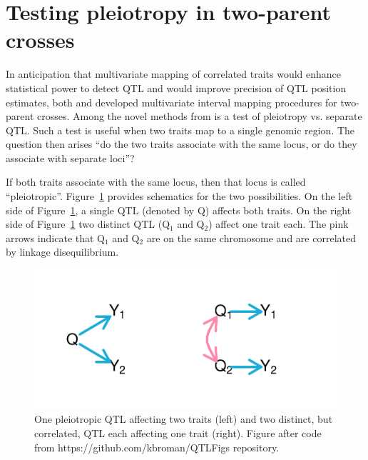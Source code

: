 \documentclass[oneside]{book}\usepackage[]{graphicx}\usepackage[]{color}
\newenvironment{knitrout}{}{} %
\begin{document}
\section{Testing pleiotropy in two-parent crosses}\label{sec:pleiotropy-two-parent}

In anticipation that multivariate mapping of correlated traits would enhance statistical
power to detect QTL and would improve precision of QTL position estimates,
both \citet{jiang1995multiple} and \citet{korol1995interval} developed
multivariate interval mapping procedures for two-parent crosses. 
Among the novel methods from \citet{jiang1995multiple} is a test of pleiotropy vs. 
separate QTL.
Such a test is useful when two traits map to a single genomic region.
The question then arises ``do the two traits associate with the same locus, 
or do they associate with separate loci''?

If both traits associate with the same locus, then that locus is called ``pleiotropic''.
Figure~\ref{fig:pleiotropy-2traits}
provides schematics for the two possibilities.
On the left side of Figure~\ref{fig:pleiotropy-2traits}, a single QTL (denoted by Q) affects both traits.
On the right side of Figure~\ref{fig:pleiotropy-2traits} two distinct QTL (Q$_1$ and Q$_2$)
affect one trait each. The pink arrows indicate that Q$_1$ and Q$_2$ are on the same 
chromosome and are correlated by linkage disequilibrium.

\begin{knitrout}
\color{fgcolor}\begin{figure}
\includegraphics[width=\textwidth]{figure/pleiotropy-2traits-1} \caption[One pleiotropic QTL affecting two traits (left) and two distinct, but correlated, QTL each affecting one trait (right)]{One pleiotropic QTL affecting two traits (left) and two distinct, but correlated, QTL each affecting one trait (right). Figure after code from https://github.com/kbroman/QTLFigs repository.}\label{fig:pleiotropy-2traits}
\end{figure}


\end{knitrout}
\end{document}
